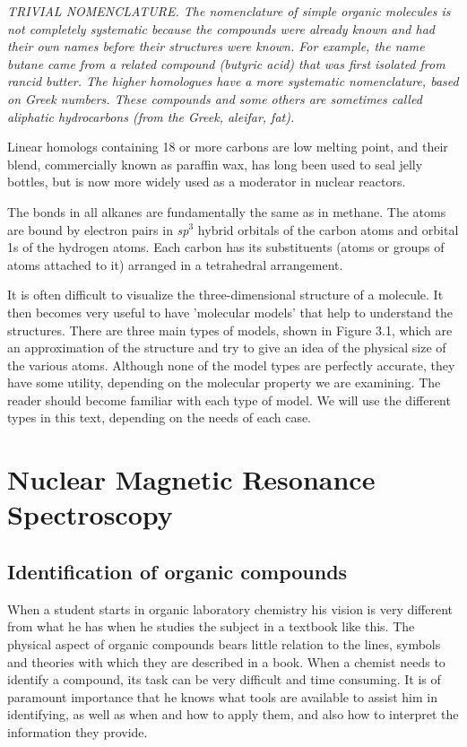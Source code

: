 \emph{TRIVIAL NOMENCLATURE. The nomenclature of simple organic molecules is not completely systematic because the compounds were already known and had their own names before their structures were known. For example, the name butane came from a related compound (butyric acid) that was first isolated from rancid butter. The higher homologues have a more systematic nomenclature, based on Greek numbers. These compounds and some others are sometimes called aliphatic hydrocarbons (from the Greek, aleifar, fat).}

Linear homologs containing 18 or more carbons are low melting point, and their blend, commercially known as paraffin wax, has long been used to seal jelly bottles, but is now more widely used as a moderator in nuclear reactors.

The bonds in all alkanes are fundamentally the same as in methane. The atoms are bound by electron pairs in \emph{sp$^3$} hybrid orbitals of the carbon atoms and orbital 1s of the hydrogen atoms. Each carbon has its substituents (atoms or groups of atoms attached to it) arranged in a tetrahedral arrangement.

It is often difficult to visualize the three-dimensional structure of a molecule. It then becomes very useful to have 'molecular models' that help to understand the structures. There are three main types of models, shown in Figure 3.1, which are an approximation of the structure and try to give an idea of ​​the physical size of the various atoms. Although none of the model types are perfectly accurate, they have some utility, depending on the molecular property we are examining. The reader should become familiar with each type of model. We will use the different types in this text, depending on the needs of each case.


\chapter{Nuclear Magnetic Resonance Spectroscopy}
\section{Identification of organic compounds}
When a student starts in organic laboratory chemistry his vision is very different from what he has when he studies the subject in a textbook like this. The physical aspect of organic compounds bears little relation to the lines, symbols and theories with which they are described in a book. When a chemist needs to identify a compound, its task can be very difficult and time consuming. It is of paramount importance that he knows what tools are available to assist him in identifying, as well as when and how to apply them, and also how to interpret the information they provide.

